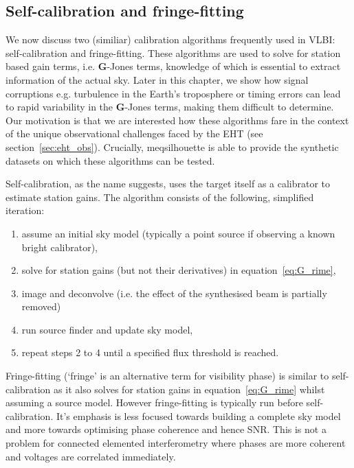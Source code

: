 \subsection{Self-calibration and fringe-fitting}\label{sec:self_cal}
We now discuss two (similiar) calibration algorithms frequently used in VLBI: self-calibration and fringe-fitting. These algorithms are used to solve for station based gain terms, i.e. $\bm G$-Jones terms, knowledge of which is essential to extract information of the actual sky. Later in this chapter, we show how signal corruptions e.g. turbulence in the Earth's troposphere or timing errors can lead to rapid variability in the $\bm G$-Jones terms, making them difficult to determine. Our motivation is that we are interested how these algorithms fare in the context of the unique observational challenges faced by the EHT (see section~\ref{sec:eht_obs}). Crucially, {\sc meqsilhouette} is able to provide the synthetic datasets on which these algorithms can be tested. 


Self-calibration, as the name suggests, uses the target itself as a calibrator to estimate station gains.
The algorithm consists of the following, simplified iteration:
\begin{enumerate}
 \item assume an initial sky model (typically a point source if observing a known bright calibrator),
 \item solve for station gains (but not their derivatives) in equation~\ref{eq:G_rime},
 \item image and deconvolve (i.e. the effect of the synthesised beam is partially removed)
 \item run source finder and update sky model,
 \item repeat steps 2 to 4 until a specified flux threshold is reached.
\end{enumerate}



Fringe-fitting (`fringe' is an alternative term for visibility phase) is similar to self-calibration as it also solves for station gains in equation~\ref{eq:G_rime} whilst assuming a source model. However fringe-fitting is typically run before self-calibration. It's emphasis is less focused towards building a complete sky model and more towards optimising phase coherence and hence SNR. This is not a problem for connected elemented interferometry where phases are more coherent and voltages are correlated immediately. 


